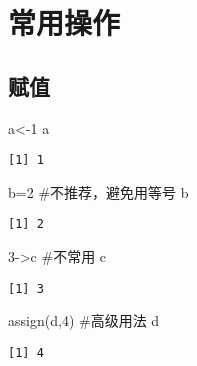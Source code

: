 \documentclass[
  letterpaper,
  DIV=11,
  numbers=noendperiod]{scrreprt}
\newenvironment{Shaded}{\begin{snugshade}}{\end{snugshade}}
\newcommand{\CommentTok}[1]{\textcolor[rgb]{0.37,0.37,0.37}{#1}}
\newcommand{\DecValTok}[1]{\textcolor[rgb]{0.68,0.00,0.00}{#1}}
\newcommand{\FunctionTok}[1]{\textcolor[rgb]{0.28,0.35,0.67}{#1}}
\newcommand{\NormalTok}[1]{\textcolor[rgb]{0.00,0.23,0.31}{#1}}
\newcommand{\OtherTok}[1]{\textcolor[rgb]{0.00,0.23,0.31}{#1}}
\newcommand{\StringTok}[1]{\textcolor[rgb]{0.13,0.47,0.30}{#1}}
\begin{document}
\chapter{常用操作}\label{ux5e38ux7528ux64cdux4f5c}

\section{赋值}\label{ux8d4bux503c}

\begin{Shaded}
\begin{Highlighting}[]
\NormalTok{a}\OtherTok{\textless{}{-}}\DecValTok{1}
\NormalTok{a}
\end{Highlighting}
\end{Shaded}

\begin{verbatim}
[1] 1
\end{verbatim}

\begin{Shaded}
\begin{Highlighting}[]
\NormalTok{b}\OtherTok{=}\DecValTok{2} \CommentTok{\#不推荐，避免用等号}
\NormalTok{b}
\end{Highlighting}
\end{Shaded}

\begin{verbatim}
[1] 2
\end{verbatim}

\begin{Shaded}
\begin{Highlighting}[]
\DecValTok{3}\OtherTok{{-}\textgreater{}}\NormalTok{c }\CommentTok{\#不常用}
\NormalTok{c}
\end{Highlighting}
\end{Shaded}

\begin{verbatim}
[1] 3
\end{verbatim}

\begin{Shaded}
\begin{Highlighting}[]
\FunctionTok{assign}\NormalTok{(}\StringTok{\textquotesingle{}d\textquotesingle{}}\NormalTok{,}\DecValTok{4}\NormalTok{) }\CommentTok{\#高级用法}
\NormalTok{d}
\end{Highlighting}
\end{Shaded}

\begin{verbatim}
[1] 4
\end{verbatim}
\end{document}
